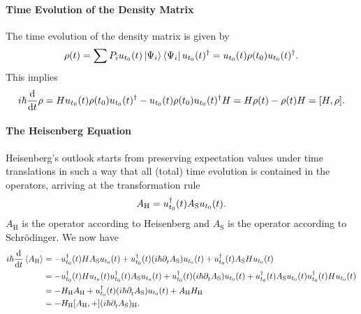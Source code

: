 \paragraph{Time Evolution of the Density Matrix}
The time evolution of the density matrix is given by
\begin{align*}
	\rho(t) = \sum P_{i}u_{t_{0}}(t)\ket{\Psi_{i}}\bra{\Psi_{i}}u_{t_{0}}(t)^{\dagger} = u_{t_{0}}(t)\rho(t_{0})u_{t_{0}}(t)^{\dagger}.
\end{align*}
This implies
\begin{align*}
	i\hbar\dv{t}\rho = Hu_{t_{0}}(t)\rho(t_{0})\adj{u_{t_{0}}(t)} - u_{t_{0}}(t)\rho(t_{0})\adj{u_{t_{0}}(t)}H = H\rho(t) - \rho(t)H = \comm{H}{\rho}.
\end{align*}

\paragraph{The Heisenberg Equation}
Heisenberg's outlook starts from preserving expectation values under time translations in such a way that all (total) time evolution is contained in the operators, arriving at the transformation rule
\begin{align*}
A_{\text{H}} = u_{t_{0}}^{\dagger}(t)A_{\text{S}}u_{t_{0}}(t).
\end{align*}
$A_{\text{H}}$ is the operator according to Heisenberg and $A_{\text{S}}$ is the operator according to Schrödinger. We now have
\begin{align*}
	i\hbar\dv{t}\expval{A_{\text{H}}} &= -\adj{u_{t_{0}}}(t)HA_{\text{S}}u_{t_{0}}(t) + \adj{u_{t_{0}}}(t)(i\hbar\del{t}{A_{\text{S}}})u_{t_{0}}(t) + \adj{u_{t_{0}}}(t)A_{\text{S}}Hu_{t_{0}}(t) \\
	                                  &= -\adj{u_{t_{0}}}(t)Hu_{t_{0}}(t)\adj{u_{t_{0}}}(t)A_{\text{S}}u_{t_{0}}(t) + \adj{u_{t_{0}}}(t)(i\hbar\del{t}{A_{\text{S}}})u_{t_{0}}(t) + \adj{u_{t_{0}}}(t)A_{\text{S}}u_{t_{0}}(t)\adj{u_{t_{0}}}(t)Hu_{t_{0}}(t) \\
	                                  &= -H_{\text{H}}A_{\text{H}} + \adj{u_{t_{0}}}(t)(i\hbar\del{t}{A_{\text{S}}})u_{t_{0}}(t) + A_{\text{H}}H_{\text{H}} \\
	                                  &= -{H_{\text{H}}}\comm{A_{\text{H}}} + (i\hbar\del{t}{A_{\text{S}}})_{\text{H}}.
\end{align*}

